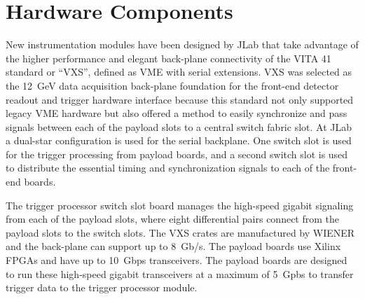 \section{Hardware Components}

New instrumentation modules have been designed by JLab that take advantage of the higher performance and elegant back-plane connectivity of the VITA 41 standard or ``VXS'', defined as VME with serial extensions. 
VXS was selected as the 12~GeV data acquisition back-plane foundation for the front-end detector readout and trigger hardware interface because this standard not only supported legacy VME hardware but also offered a method to easily synchronize and pass signals between each of the payload slots to a central switch fabric slot. At JLab a dual-star configuration is used for the serial backplane. One switch slot is used for the trigger processing from payload boards, and a second switch slot is used to distribute the essential timing and synchronization signals to each of the front-end boards.

The trigger processor switch slot board manages the high-speed gigabit signaling from each of the payload slots, where eight differential pairs connect from the payload slots to the switch slots. The VXS crates are manufactured by WIENER and the back-plane can support up to 8~Gb/s. The payload boards use Xilinx FPGAs and have up to 10~Gbps transceivers. The payload boards are designed to run these high-speed gigabit transceivers at a maximum of 5~Gpbs to transfer trigger data to the trigger processor module. 

